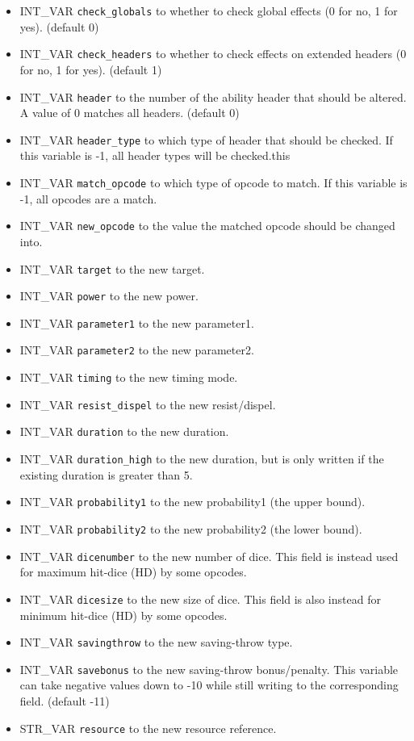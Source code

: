 \documentclass{article}
\begin{document}
\begin{itemize}
\item INT_VAR \verb+check_globals+ to whether to check global effects (0 for no, 1 for yes). (default 0)
\item INT_VAR \verb+check_headers+ to whether to check effects on extended headers (0 for no, 1 for yes). (default 1)
\item INT_VAR \verb+header+ to the number of the ability header that should be altered. A value of 0 matches all headers. (default 0)
\item INT_VAR \verb+header_type+ to which type of header that should be checked. If this variable is -1, all header types will be checked.this
\item INT_VAR \verb+match_opcode+ to which type of opcode to match. If this variable is -1, all opcodes are a match.
\item INT_VAR \verb+new_opcode+ to the value the matched opcode should be changed into.
\item INT_VAR \verb+target+ to the new target.
\item INT_VAR \verb+power+ to the new power.
\item INT_VAR \verb+parameter1+ to the new parameter1.
\item INT_VAR \verb+parameter2+ to the new parameter2.
\item INT_VAR \verb+timing+ to the new timing mode.
\item INT_VAR \verb+resist_dispel+ to the new resist/dispel.
\item INT_VAR \verb+duration+ to the new duration.
\item INT_VAR \verb+duration_high+ to the new duration, but is only written if the existing duration is greater than 5.
\item INT_VAR \verb+probability1+ to the new probability1 (the upper bound).
\item INT_VAR \verb+probability2+ to the new probability2 (the lower bound).
\item INT_VAR \verb+dicenumber+ to the new number of dice. This field is instead used for maximum hit-dice (HD) by some opcodes.
\item INT_VAR \verb+dicesize+ to the new size of dice. This field is also instead for minimum hit-dice (HD) by some opcodes.
\item INT_VAR \verb+savingthrow+ to the new saving-throw type.
\item INT_VAR \verb+savebonus+ to the new saving-throw bonus/penalty. This variable can take negative values down to -10 while still writing to the corresponding field. (default -11)
\item STR_VAR \verb+resource+ to the new resource reference.
\end{itemize}
\\
\end{document}
